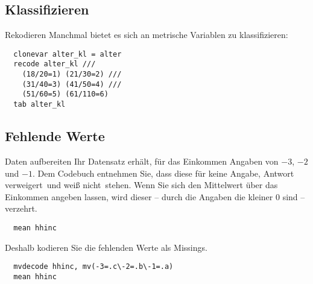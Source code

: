 \subsection{Klassifizieren}
\begin{frame}[fragile]{Rekodieren}   
Manchmal bietet es sich an metrische Variablen zu klassifizieren:
\begin{lstlisting}
  clonevar alter_kl = alter
  recode alter_kl ///
    (18/20=1) (21/30=2) ///
    (31/40=3) (41/50=4) ///
    (51/60=5) (61/110=6)
  tab alter_kl
\end{lstlisting}

\end{frame}

\subsection{Fehlende Werte}
\begin{frame}[fragile]{Daten aufbereiten}   
Ihr Datensatz erhält, für das Einkommen Angaben von $-3$, $-2$ und $-1$. Dem Codebuch entnehmen Sie, dass diese für \glqq keine Angabe\grqq, \glqq Antwort verweigert\grqq~und \glqq weiß nicht\grqq~stehen.
Wenn Sie sich den Mittelwert über das Einkommen angeben lassen, wird dieser -- durch die Angaben die kleiner $0$ sind -- verzehrt.
\begin{lstlisting}
  mean hhinc
\end{lstlisting}
Deshalb kodieren Sie die fehlenden Werte als Missings.
\begin{lstlisting}
  mvdecode hhinc, mv(-3=.c\-2=.b\-1=.a)
  mean hhinc
\end{lstlisting}
\end{frame}

